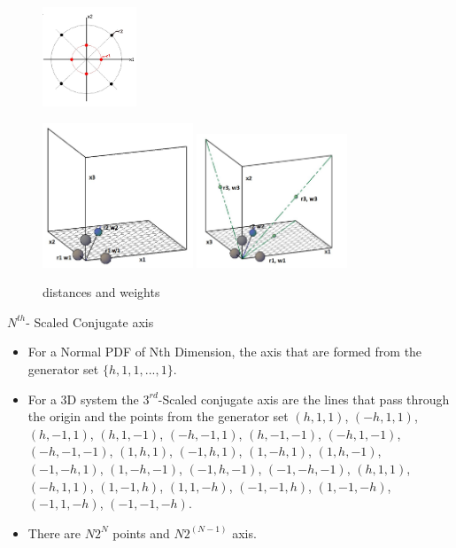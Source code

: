 \documentclass[11pt]{beamer}
\begin{document}
\begin{frame}
\begin{figure}[h]
	\centering
	\includegraphics[width=0.25\textwidth]{2dconjaxis.jpg}
\end{figure}
\begin{figure}[h]
	\centering
		\includegraphics[width=0.4\textwidth]{3dnthconjaxis.jpg}
			\includegraphics[width=0.4\textwidth]{3dnthconjand2ndconj.jpg}
	\caption{distances and weights}
\end{figure}
\end{frame}
\begin{frame}
\begin{block}{$N^{th}$- Scaled Conjugate axis}
\begin{itemize}[<+->]
\item For a Normal PDF of Nth Dimension, the axis that are formed from the generator set $\{h,1,1,...,1 \}$. 
\item For a 3D system the $3^{rd}$-Scaled conjugate axis are the lines that pass through the origin and the points from the generator set $(h,1,1)$, $(-h,1,1)$, $(h,-1,1)$, $(h,1,-1)$, $(-h,-1,1)$, $(h,-1,-1)$, $(-h,1,-1)$, $(-h,-1,-1)$, $(1,h,1)$, $(-1,h,1)$, $(1,-h,1)$, $(1,h,-1)$, $(-1,-h,1)$, $(1,-h,-1)$, $(-1,h,-1)$, $(-1,-h,-1)$, $(h,1,1)$, $(-h,1,1)$, $(1,-1,h)$, $(1,1,-h)$, $(-1,-1,h)$, $(1,-1,-h)$, $(-1,1,-h)$, $(-1,-1,-h)$.
\item There are $N2^N$ points and $N2^{(N-1)}$ axis. 
\end{itemize}
\end{block}
\end{frame}
\end{document}
